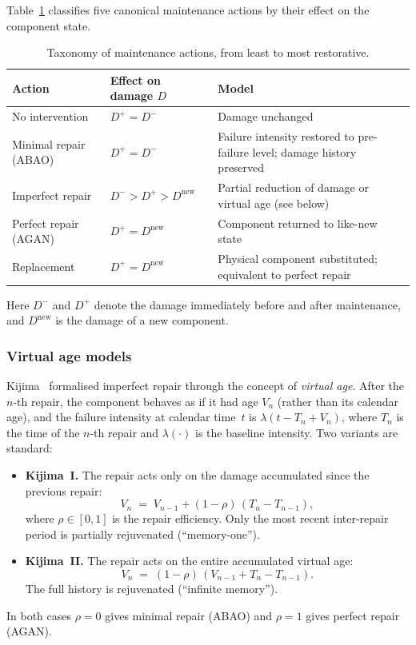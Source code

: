 \documentclass[11pt,a4paper]{article}
\theoremstyle{plain}
\theoremstyle{definition}
\theoremstyle{remark}
\begin{document}
Table~\ref{tab:repair_actions} classifies five canonical maintenance actions by their effect on the component state.

\begin{table}[htbp]
\centering
\caption{Taxonomy of maintenance actions, from least to most restorative.}
\label{tab:repair_actions}
\small
\begin{tabular}{@{}p{3.0cm}p{4.5cm}p{5.8cm}@{}}
\toprule
\textbf{Action} & \textbf{Effect on damage $D$} & \textbf{Model} \\
\midrule
No intervention
  & $D^+ = D^-$
  & Damage unchanged \\[3pt]
Minimal repair (ABAO)
  & $D^+ = D^-$
  & Failure intensity restored to pre-failure level; damage history preserved~\cite{BrownProschan1983} \\[3pt]
Imperfect repair
  & $D^- > D^+ > D^{\mathrm{new}}$
  & Partial reduction of damage or virtual age (see below) \\[3pt]
Perfect repair (AGAN)
  & $D^+ = D^{\mathrm{new}}$
  & Component returned to like-new state \\[3pt]
Replacement
  & $D^+ = D^{\mathrm{new}}$
  & Physical component substituted; equivalent to perfect repair \\
\bottomrule
\end{tabular}
\end{table}

\noindent Here $D^-$ and $D^+$ denote the damage immediately before and after maintenance, and $D^{\mathrm{new}}$ is the damage of a new component.

\subsubsection{Virtual age models}

Kijima~\cite{Kijima1989} formalised imperfect repair through the concept of \emph{virtual age}.
After the $n$-th repair, the component behaves as if it had age $V_n$ (rather than its calendar age), and the failure intensity at calendar time~$t$ is $\lambda(t - T_n + V_n)$, where $T_n$ is the time of the $n$-th repair and $\lambda(\cdot)$ is the baseline intensity.
Two variants are standard:
\begin{itemize}
  \item \textbf{Kijima~I.} The repair acts only on the damage accumulated since the previous repair:
    \[
      V_n \;=\; V_{n-1} + (1-\rho)\,(T_n - T_{n-1}),
    \]
    where $\rho \in [0,1]$ is the repair efficiency.
    Only the most recent inter-repair period is partially rejuvenated (``memory-one'').
  \item \textbf{Kijima~II.} The repair acts on the entire accumulated virtual age:
    \[
      V_n \;=\; (1-\rho)\,(V_{n-1} + T_n - T_{n-1}).
    \]
    The full history is rejuvenated (``infinite memory'').
\end{itemize}
In both cases $\rho = 0$ gives minimal repair (ABAO) and $\rho = 1$ gives perfect repair (AGAN).
\end{document}
